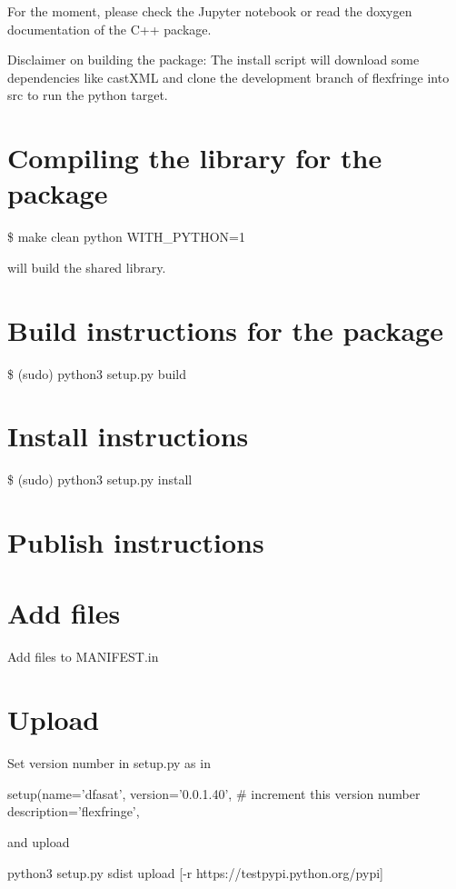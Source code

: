 For the moment, please check the Jupyter notebook or read the doxygen documentation of the C++ package.

Disclaimer on building the package\+: The install script will download some dependencies like cast\+X\+ML and clone the development branch of flexfringe into src to run the python target.

\section*{Compiling the library for the package }

\$ make clean python W\+I\+T\+H\+\_\+\+P\+Y\+T\+H\+ON=1

will build the shared library.

\section*{Build instructions for the package }

\$ (sudo) python3 setup.\+py build

\section*{Install instructions }

\$ (sudo) python3 setup.\+py install

\section*{Publish instructions }

\section*{Add files }

Add files to M\+A\+N\+I\+F\+E\+S\+T.\+in

\section*{Upload }

Set version number in {\ttfamily setup.\+py} as in \begin{DoxyVerb}setup(name='dfasat',
      version='0.0.1.40',  # increment this version number
      description='flexfringe',
\end{DoxyVerb}


and upload \begin{DoxyVerb}python3 setup.py sdist upload [-r https://testpypi.python.org/pypi]\end{DoxyVerb}
 